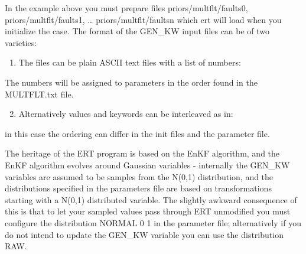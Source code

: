 \documentclass[a4paper,10pt,english]{sphinxmanual}
\begin{document}
\begin{sphinxShadowBox}
In the example above you must prepare files priors/multflt/faults0,
priors/multflt/faults1, … priors/multflt/faultsn which ert will load when
you initialize the case. The format of the GEN\_KW input files can be of two
varieties:
\begin{enumerate}
\item {} 
The files can be plain ASCII text files with a list of numbers:

\end{enumerate}

%
\begin{sphinxVerbatim}[commandchars=\\\{\}]
\end{sphinxVerbatim}

The numbers will be assigned to parameters in the order found in the
MULTFLT.txt file.
\begin{enumerate}
\setcounter{enumi}{1}
\item {} 
Alternatively values and keywords can be interleaved as in:

\end{enumerate}

%
\begin{sphinxVerbatim}[commandchars=\\\{\}]
 
 
\end{sphinxVerbatim}

in this case the ordering can differ in the init files and the parameter file.

The heritage of the ERT program is based on the EnKF algorithm, and the EnKF
algorithm evolves around Gaussian variables - internally the GEN\_KW variables
are assumed to be samples from the N(0,1) distribution, and the distributions
specified in the parameters file are based on transformations starting with a
N(0,1) distributed variable. The slightly awkward consequence of this is that
to let your sampled values pass through ERT unmodified you must configure the
distribution NORMAL 0 1 in the parameter file; alternatively if you do not
intend to update the GEN\_KW variable you can use the distribution RAW.
\end{sphinxShadowBox}
\label{\detokenize{keywords/index:gen-param}}
\end{document}
